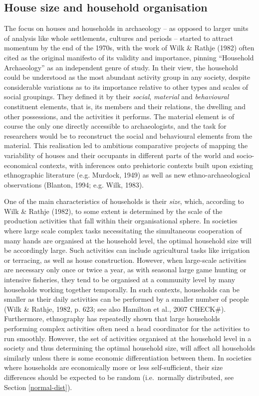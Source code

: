 \documentclass[
  12pt,
]{book}
\begin{document}
\hypertarget{house-size-and-household-organisation}{%
\subsection{House size and household organisation}\label{house-size-and-household-organisation}}

The focus on houses and households in archaeology -- as opposed to larger units of analysis like whole settlements, cultures and periods -- started to attract momentum by the end of the 1970s, with the work of Wilk \& Rathje (1982) often cited as the original manifesto of its validity and importance, pinning ``Household Archaeology'' as an independent genre of study. In their view, the household could be understood as the most abundant activity group in any society, despite considerable variations as to its importance relative to other types and scales of social groupings. They defined it by their \emph{social}, \emph{material} and \emph{behavioural} constituent elements, that is, its members and their relations, the dwelling and other possessions, and the activities it performs. The material element is of course the only one directly accessible to archaeologists, and the task for researchers would be to reconstruct the social and behavioural elements from the material. This realisation led to ambitious comparative projects of mapping the variability of houses and their occupants in different parts of the world and socio-economical contexts, with inferences onto prehistoric contexts built upon existing ethnographic literature (e.g. Murdock, 1949) as well as new ethno-archaeological observations (Blanton, 1994; e.g. Wilk, 1983).

One of the main characteristics of households is their \emph{size}, which, according to Wilk \& Rathje (1982), to some extent is determined by the scale of the production activities that fall within their organisational sphere. In societies where large scale complex tasks necessitating the simultaneous cooperation of many hands are organised at the household level, the optimal household size will be accordingly large. Such activities can include agricultural tasks like irrigation or terracing, as well as house construction. However, when large-scale activities are necessary only once or twice a year, as with seasonal large game hunting or intensive fisheries, they tend to be organised at a community level by many households working together temporally. In such contexts, households can be smaller as their daily activities can be performed by a smaller number of people (Wilk \& Rathje, 1982, p. 623; see also Hamilton et al., 2007 CHECK\#). Furthermore, ethnography has repeatedly shown that large households performing complex activities often need a head coordinator for the activities to run smoothly. However, the set of activities organised at the household level in a society and thus determining the optimal household size, will affect all households similarly unless there is some economic differentiation between them. In societies where households are economically more or less self-sufficient, their size differences should be expected to be random (i.e.~normally distributed, see Section \ref{normal-dist}).
\end{document}
